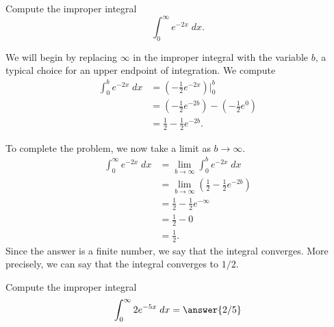 \documentclass{ximera}
\begin{document}
\begin{example}
Compute the improper integral
\[
\int_0^\infty e^{-2x} \; dx.
\]

We will begin by replacing $\infty$ in the improper integral with the variable $b$, a typical choice for an upper endpoint of integration.
We compute
\begin{align*}
\int_0^b e^{-2x} \; dx &= \left(-\frac12 e^{-2x} \right) \bigg|_0^b\\
                       &= \left(-\frac12 e^{-2b} \right) - \left(-\frac12 e^{0} \right)\\
                       &=\frac12 -\frac12 e^{-2b}.
\end{align*}
                       
To complete the problem, we now take a limit as $b \to \infty$.
\begin{align*}
\int_0^\infty e^{-2x} \; dx &= \lim_{b \to \infty}\int_0^b e^{-2x} \; dx\\
                       &=\lim_{b \to \infty} \left(\frac12 -\frac12 e^{-2b}\right)\\
                       &= \frac12 -\frac12 e^{-\infty}\\
                       &= \frac12 - 0 \\
                       &= \frac12.
\end{align*}
Since the answer is a finite number, we say that the integral converges.
More precisely, we can say that the integral converges to $1/2$.

\end{example}




\begin{problem}
Compute the improper integral
\[
\int_0^\infty 2e^{-5x} \; dx = \answer{2/5}
\]

\end{problem}
\end{document}
